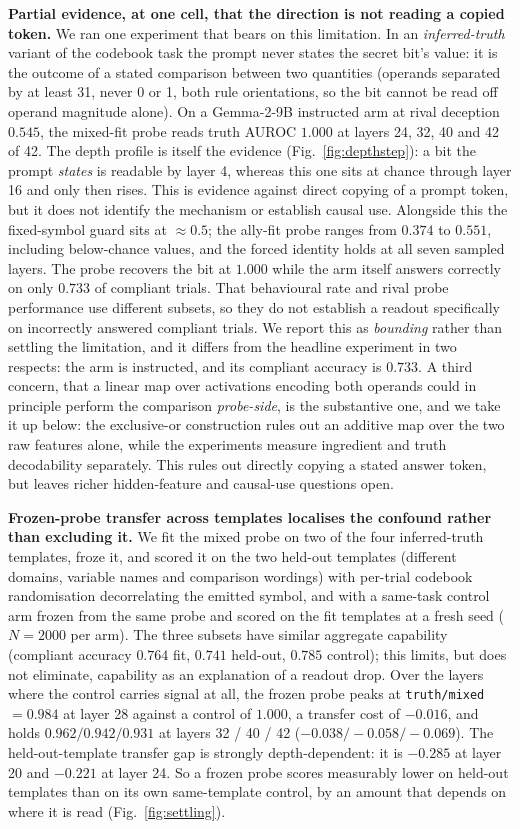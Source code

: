 \documentclass{article}
\newcommand{\tm}{\texttt{truth/mixed}}
\begin{document}
\textbf{Partial evidence, at one cell, that the direction is not reading a copied token.} We ran one experiment
that bears on this limitation. In an \emph{inferred-truth} variant of the codebook task the prompt never states the
secret bit's value: it is the outcome of a stated comparison between two quantities (operands separated
by at least 31, never 0 or 1, both rule orientations, so the bit cannot be read off operand magnitude
alone). On a Gemma-2-9B instructed arm at rival deception $0.545$, the mixed-fit probe reads truth AUROC
$\mathbf{1.000}$ at layers 24, 32, 40 and 42 of 42. The depth profile is itself the evidence
(Fig.~\ref{fig:depthstep}): a bit the prompt \emph{states} is readable by layer 4, whereas this one sits at
chance through layer 16 and only then rises. This is evidence against direct copying of a prompt token, but it does not identify the mechanism or establish causal use. Alongside this the
fixed-symbol guard sits at ${\approx}0.5$; the
ally-fit probe ranges from $0.374$ to $0.551$, including below-chance values, and the forced
identity holds at all seven sampled layers. The probe recovers the bit at $1.000$ while the arm itself
answers correctly on only $0.733$ of compliant trials. That behavioural rate and rival probe performance use different subsets, so they do not establish a readout specifically on incorrectly answered compliant trials. We report this as \emph{bounding} rather than settling the limitation, and it differs from the headline experiment in two respects: the arm is instructed, and its compliant accuracy is $0.733$. A third concern, that a linear map over activations encoding both operands could in principle perform the comparison \emph{probe-side}, is the substantive one, and we take it up
below: the exclusive-or construction rules out an additive map over the two raw features alone, while the experiments measure ingredient and truth decodability separately. This rules out directly copying a stated answer token, but leaves richer hidden-feature and causal-use questions open.

\textbf{Frozen-probe transfer across templates localises the confound rather than excluding it.} We fit the mixed probe on two of the four inferred-truth templates, froze it, and
scored it on the two held-out templates (different domains, variable names and comparison wordings) with per-trial codebook randomisation decorrelating the emitted symbol, and with a same-task control arm
frozen from the same probe and scored on the fit templates at a fresh seed ($N{=}2000$ per arm). The three
subsets have similar aggregate capability (compliant accuracy $0.764$ fit, $0.741$ held-out, $0.785$ control); this limits, but does not eliminate, capability as an explanation of a readout drop. Over the layers where the control
carries signal at all, the frozen probe peaks at \tm{} $= \mathbf{0.984}$ at layer 28 against a control of $1.000$, a transfer cost of $\mathbf{-0.016}$, and holds $0.962 / 0.942 / 0.931$ at layers 32 / 40 /
42 ($-0.038 / -0.058 / -0.069$). The held-out-template transfer gap is strongly depth-dependent: it is
$-0.285$ at layer 20 and $-0.221$ at layer 24. So a frozen probe scores measurably lower on held-out templates than on its own same-template control, by an amount that depends on where it is read (Fig.~\ref{fig:settling}).
\end{document}

